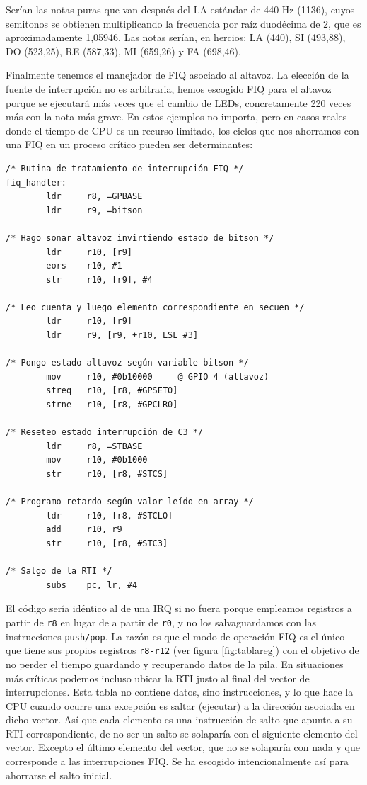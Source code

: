 Serían las notas puras que van después del LA estándar de 440 Hz (1136), cuyos semitonos se
obtienen multiplicando la frecuencia por raíz duodécima de 2, que es aproximadamente 1,05946.
Las notas serían, en hercios: LA (440), SI (493,88), DO (523,25), RE (587,33), MI (659,26) y
FA (698,46).

Finalmente tenemos el manejador de FIQ asociado al altavoz. La elección de la fuente de
interrupción no es arbitraria, hemos escogido FIQ para el altavoz porque se ejecutará más veces
que el cambio de LEDs, concretamente 220 veces más con la nota más grave. En estos ejemplos
no importa, pero en casos reales donde el tiempo de CPU es un recurso limitado, los ciclos
que nos ahorramos con una FIQ en un proceso crítico pueden ser determinantes:

\begin{lstlisting}
/* Rutina de tratamiento de interrupción FIQ */
fiq_handler:
        ldr     r8, =GPBASE
        ldr     r9, =bitson

/* Hago sonar altavoz invirtiendo estado de bitson */
        ldr     r10, [r9]
        eors    r10, #1
        str     r10, [r9], #4

/* Leo cuenta y luego elemento correspondiente en secuen */
        ldr     r10, [r9]
        ldr     r9, [r9, +r10, LSL #3]

/* Pongo estado altavoz según variable bitson */
        mov     r10, #0b10000     @ GPIO 4 (altavoz)
        streq   r10, [r8, #GPSET0]
        strne   r10, [r8, #GPCLR0]

/* Reseteo estado interrupción de C3 */
        ldr     r8, =STBASE
        mov     r10, #0b1000
        str     r10, [r8, #STCS]

/* Programo retardo según valor leído en array */
        ldr     r10, [r8, #STCLO]
        add     r10, r9
        str     r10, [r8, #STC3]

/* Salgo de la RTI */
        subs    pc, lr, #4
\end{lstlisting}

El código sería idéntico al de una IRQ si no fuera porque empleamos registros a partir de
{\tt r8} en lugar de a partir de {\tt r0}, y no los salvaguardamos con las instrucciones
{\tt push/pop}. La razón es que el modo de operación FIQ es el único que tiene sus propios
registros {\tt r8-r12} (ver figura \ref{fig:tablareg}) con el objetivo de no perder el tiempo
guardando y recuperando datos de la pila. En situaciones más críticas podemos incluso ubicar
la RTI justo al final del vector de interrupciones. Esta tabla no contiene datos, sino instrucciones,
y lo que hace la CPU cuando ocurre una excepción es saltar (ejecutar) a la dirección asociada en
dicho vector. Así que cada elemento es una instrucción de salto que apunta a su RTI
correspondiente, de no ser un salto se solaparía con el siguiente elemento del vector. Excepto
el último elemento del vector, que no se solaparía con nada y que corresponde a las
interrupciones FIQ. Se ha escogido intencionalmente así para ahorrarse el salto inicial.

